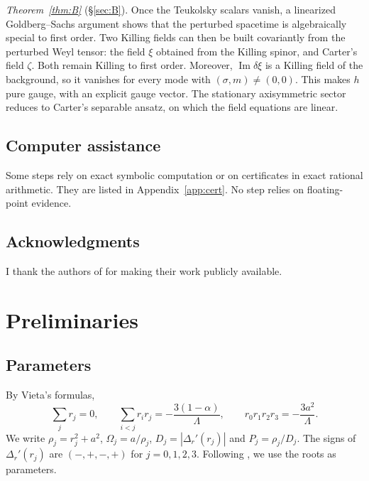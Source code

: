 \documentclass[11pt]{amsart}
\theoremstyle{definition}
\theoremstyle{remark}
\numberwithin{equation}{section}
\renewcommand{\Im}{\operatorname{Im}}
\begin{document}
\emph{Theorem~\ref{thm:B}} (\S\ref{sec:B}). Once the Teukolsky scalars vanish, a linearized Goldberg--Sachs argument
shows that the perturbed spacetime is algebraically special to first order. Two Killing fields can then be built
covariantly from the perturbed Weyl tensor: the field $\xi$ obtained from the Killing spinor, and Carter's field
$\zeta$. Both remain Killing to first order. Moreover, $\Im\delta\xi$ is a Killing field of the background, so it
vanishes for every mode with $(\sigma,m)\ne(0,0)$. This makes $h$ pure gauge, with an explicit gauge vector. The
stationary axisymmetric sector reduces to Carter's separable ansatz, on which the field equations are linear.

\subsection*{Computer assistance}
Some steps rely on exact symbolic computation or on certificates in exact rational arithmetic. They are listed in
Appendix~\ref{app:cert}. No step relies on floating-point evidence.

\subsection*{Acknowledgments}
I thank the authors of \cite{Hin26,HPV25} for making their work publicly available.

\section{Preliminaries}\label{sec:prelim}

\subsection{Parameters}
By Vieta's formulas,
\begin{equation}\label{eq:vieta}
\sum_j r_j=0,\qquad \sum_{i<j}r_ir_j=-\frac{3(1-\alpha)}{\Lambda},\qquad r_0r_1r_2r_3=-\frac{3a^2}{\Lambda}.
\end{equation}
We write $\rho_j=r_j^2+a^2$, $\Omega_j=a/\rho_j$, $D_j=|\Delta_r'(r_j)|$ and $P_j=\rho_j/D_j$. The signs of
$\Delta_r'(r_j)$ are $(-,+,-,+)$ for $j=0,1,2,3$. Following \cite[\S6, footnote~5]{Hin26}, we use the roots as
parameters.
\end{document}
